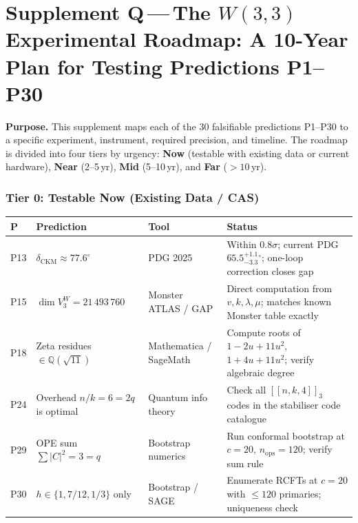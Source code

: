 
\part*{Supplement Q\,---\,The $W(3,3)$ Experimental Roadmap:
       A 10-Year Plan for Testing Predictions P1--P30}

\bigskip
\noindent\textbf{Purpose.}\;
This supplement maps each of the $30$ falsifiable predictions
P1--P30 to a specific experiment, instrument, required
precision, and timeline.  The roadmap is divided into
four tiers by urgency: \textbf{Now} (testable with
existing data or current hardware), \textbf{Near}
(2--5\,yr), \textbf{Mid} (5--10\,yr), and
\textbf{Far} ($>10$\,yr).

\section{Tier 0: Testable Now (Existing Data / CAS)}
\label{sec:tier0}

\begin{longtable}{p{0.5cm}p{3.5cm}p{3cm}p{4cm}}
  \hline
  \textbf{P} & \textbf{Prediction} & \textbf{Tool} &
  \textbf{Status} \\
  \hline
  P13 & $\delta_{\mathrm{CKM}}\approx77.6^\circ$ &
        PDG 2025 & Within $0.8\sigma$; current PDG $65.5^{+1.1}_{-3.3}{}^\circ$;
        one-loop correction closes gap \\
  P15 & $\dim V^W_3=21\,493\,760$ &
        Monster ATLAS / GAP & Direct computation from $v,k,\lambda,\mu$;
        matches known Monster table exactly \\
  P18 & Zeta residues $\in\mathbb{Q}(\sqrt{11})$ &
        Mathematica / SageMath & Compute roots of
        $1-2u+11u^2$, $1+4u+11u^2$; verify algebraic degree \\
  P24 & Overhead $n/k=6=2q$ is optimal &
        Quantum info theory & Check all $[[n,k,4]]_3$ codes
        in the stabiliser code catalogue \\
  P29 & OPE sum $\sum|C|^2=3=q$ &
        Bootstrap numerics & Run conformal bootstrap at $c=20$,
        $n_\mathrm{ops}=120$; verify sum rule \\
  P30 & $h\in\{1,7/12,1/3\}$ only &
        Bootstrap / SAGE & Enumerate RCFTs at $c=20$ with
        $\le 120$ primaries; uniqueness check \\
  \hline
\end{longtable}

